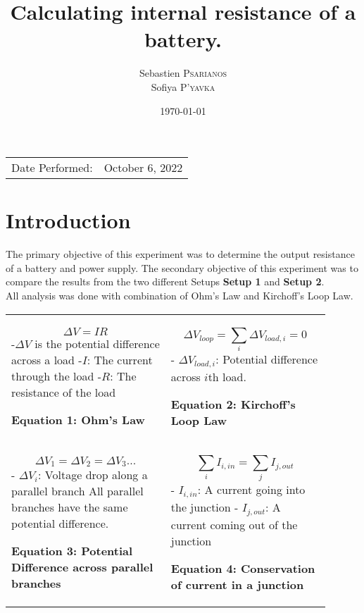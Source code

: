 \documentclass[
	letterpaper, %
	10pt, %
]{CSUniSchoolLabReport}
\title{Calculating internal resistance of a battery.}
\author{Sebastien \textsc{Psarianos}\\ Sofiya \textsc{P'yavka}}
\date{\today}
\begin{document}
\maketitle

\begin{center}
	\begin{tabular}{l r}
		Date Performed: & October 6, 2022 \\
	\end{tabular}
\end{center}
\section{Introduction}
The primary objective of this experiment was to determine the output resistance of a battery and power supply. The secondary objective of this experiment was to compare the results from the two
different Setups \textbf{Setup 1} and \textbf{Setup 2}.\\

All analysis was done with combination of Ohm's Law and Kirchoff's Loop Law.\\

\begin{tabular}{p{0.45\linewidth} p{0.45\linewidth}}
    $$\Delta V = IR$$
    -$\Delta V$ is the potential difference across a load\newline
    -$I$: The current through the load\newline
    -$R$: The resistance of the load
    \begin{center}
        \textbf{Equation 1: Ohm's Law}
    \end{center}
    &
    $$\Delta V_{loop} = \sum_i \Delta V_{load, i} = 0$$
    - $\Delta V_{load,i}$: Potential difference across $i$th load.
    \begin{center}
        \textbf{Equation 2: Kirchoff's Loop Law}
    \end{center}\\
    $$\Delta V_1 = \Delta V_2 = \Delta V_3 ...$$
    - $\Delta V_{i}$: Voltage drop along a parallel branch\newline
    All parallel branches have the same potential\newline
    difference.
    \begin{center}
        \textbf{Equation 3: Potential Difference across parallel branches}
    \end{center}
    &
    $$\sum_i I_{i, in} = \sum_j I_{j,out}$$
    - $I_{i, in}$: A current going into the junction\newline
    - $I_{j,out}$: A current coming out of the junction
    \begin{center}
        \textbf{Equation 4: Conservation of current in a junction}
    \end{center}

\end{tabular}
\end{document}
